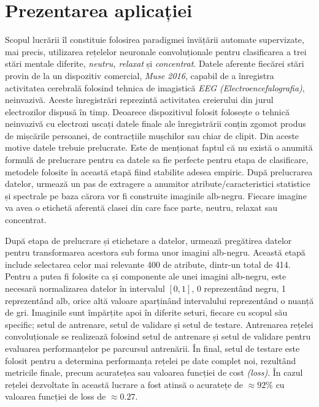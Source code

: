 \chapter{Prezentarea aplicației}\label{ch:3implementare}
Scopul lucrării îl constituie folosirea paradigmei învățării automate supervizate, mai precis, utilizarea rețelelor neuronale convoluționale pentru clasificarea a trei stări mentale diferite, \textit{neutru, relaxat} și \textit{concentrat}. Datele aferente fiecărei stări provin de la un dispozitiv comercial, \textit{Muse 2016}, capabil de a înregistra activitatea cerebrală folosind tehnica de imagistică \textit{EEG (Electroencefalografia)}, neinvazivă. Aceste înregistrări reprezintă activitatea creierului din jurul electrozilor dispusă în timp. Deoarece dispozitivul folosit folosește o tehnică neinvazivă cu electrozi uscați datele finale ale înregistrării conțin zgomot produs de mișcările persoanei, de contracțiile mușchilor sau chiar de clipit. Din aceste motive datele trebuie prelucrate. Este de menționat faptul că nu există o anumită formulă de prelucrare pentru ca datele sa fie perfecte pentru etapa de clasificare, metodele folosite în această etapă fiind stabilite adesea empiric. După prelucrarea datelor, urmează un pas de extragere a anumitor atribute/caracteristici statistice și spectrale pe baza cărora vor fi construite imaginile alb-negru. Fiecare imagine va avea o etichetă aferentă clasei din care face parte, neutru, relaxat sau concentrat.

După etapa de prelucrare și etichetare a datelor, urmează pregătirea datelor pentru transformarea acestora sub forma unor imagini alb-negru. Această etapă include selectarea celor mai relevante 400 de atribute, dintr-un total de 414. Pentru a putea fi folosite ca și componente ale unei imagini alb-negru, este necesară normalizarea datelor în intervalul $[0,1]$, 0 reprezentând negru, 1 reprezentând alb, orice altă valoare aparținând intervalului reprezentând o nuanță de gri. Imaginile sunt împărțite apoi în diferite seturi, fiecare cu scopul său specific; setul de antrenare, setul de validare și setul de testare. Antrenarea rețelei convoluționale se realizează folosind setul de antrenare și setul de validare pentru evaluarea performanțelor pe parcursul antrenării. În final, setul de testare este folosit pentru a determina performanța rețelei pe date complet noi, rezultând metricile finale, precum acuratețea sau valoarea funcției de cost \textit{(loss)}. În cazul rețelei dezvoltate în această lucrare a fost atinsă o acuratețe de $\approx92\%$ cu valoarea funcției de loss de $\approx0.27$. 

